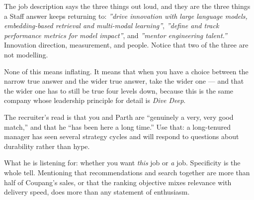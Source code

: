 \documentclass[10pt,twoside]{book}
\newcommand{\csection}[1]{\par\vspace{13pt}\noindent{\sffamily\large\bfseries\color{ink}\raggedright #1\par}\vspace{4pt}}
\begin{document}
\par{}\par\medskip
The job description says the three things out loud, and they are the three things a Staff answer keeps returning to: \textit{''drive innovation with large language models, embedding-based retrieval and multi-modal learning''}, \textit{''define and track performance metrics for model impact''}, and \textit{''mentor engineering talent.''} Innovation direction, measurement, and people. Notice that two of the three are not modelling.\par
None of this means inflating. It means that when you have a choice between the narrow true answer and the wider true answer, take the wider one --- and that the wider one has to still be true four levels down, because this is the same company whose leadership principle for detail is \textit{Dive Deep}.\par
\csection{Team fit runs in both directions}
The recruiter's read is that you and Parth are ``genuinely a very, very good match,'' and that he ``has been here a long time.'' Use that: a long-tenured manager has seen several strategy cycles and will respond to questions about durability rather than hype.\par
What he is listening for: whether you want \textit{this} job or \textit{a} job. Specificity is the whole tell. Mentioning that recommendations and search together are more than half of Coupang's sales, or that the ranking objective mixes relevance with delivery speed, does more than any statement of enthusiasm.\par
\end{document}
